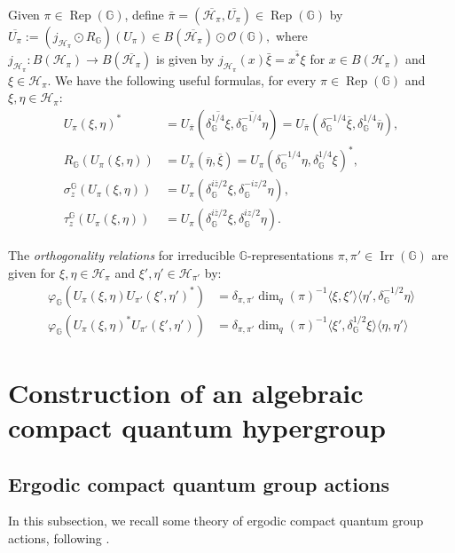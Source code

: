 \documentclass[reqno]{amsart}
\numberwithin{equation}{section}
\DeclareMathOperator{\Rep}{\mathrm{Rep}}
\DeclareMathOperator{\Irr}{\mathrm{Irr}}
\newcommand{\mcH}{\mathcal{H}}
\newcommand{\mcO}{\mathcal{O}}
\newcommand{\G}{\mathbb{G}}
\begin{document}
Given $\pi\in \Rep(\G)$, define $\bar{\pi}= (\overline{\mcH_\pi}, \overline{U_\pi})\in \Rep(\G)$ by
$\overline{U_\pi}:= (j_{\mcH_\pi}\odot R_\G)(U_\pi) \in B(\overline{\mcH_\pi})\odot \mcO(\G),$ where $j_{\mcH_\pi}: B(\mcH_\pi)\to B(\overline{\mcH_\pi})$ is given by $j_{\mcH_\pi}(x)\bar{\xi}= \overline{x^*\xi}$ for $x\in B(\mcH_\pi)$ and $\xi \in \mcH_\pi$. We have the following useful formulas, for every $\pi \in \Rep(\G)$ and $\xi, \eta \in \mcH_\pi$:
\begin{align}
    U_\pi(\xi, \eta)^* &= U_{\bar{\pi}}(\overline{\delta^{1/4}_\G\xi}, \overline{\delta^{-1/4}_\G\eta})= U_{\bar{\pi}}(\delta^{-1/4}_\G \overline{\xi}, \delta^{1/4}_\G \overline{\eta}),\\
    \label{aa}R_\G(U_\pi(\xi, \eta))&= U_{\bar{\pi}}(\overline{\eta}, \overline{\xi})= U_\pi(\delta_\G^{-1/4}\eta, \delta_\G^{1/4}\xi)^*,\\
\label{bb}\sigma_z^\G(U_{\pi}(\xi,\eta)) &= U_{\pi}(\delta_\G^{i\overline{z}/2}\xi,\delta^{-iz/2}_\G\eta),\\
\label{cc}\tau_z^\G(U_{\pi}(\xi,\eta)) &= U_{\pi}(\delta_\G^{i\overline{z}/2}\xi,\delta_\G^{iz/2}\eta).
\end{align}

The \emph{orthogonality relations} for irreducible $\G$-representations $\pi,\pi'\in \Irr(\G)$ are given for $\xi, \eta \in \mcH_\pi$ and $\xi', \eta'\in \mcH_{\pi'}$ by:
\begin{align}\label{EqPW1}
\varphi_\G(U_{\pi}(\xi,\eta)U_{\pi'}(\xi',\eta')^*) &= \delta_{\pi,\pi'} \dim_q(\pi)^{-1}\langle\xi, \xi'\rangle \langle \eta',\delta_\G^{-1/2}\eta\rangle\\
\label{EqPW2}
\varphi_\G(U_{\pi}(\xi,\eta)^*U_{\pi'}(\xi',\eta')) &=\delta_{\pi,\pi'} \dim_q(\pi)^{-1} \langle \xi',\delta_\G^{1/2}\xi\rangle \langle \eta, \eta'\rangle
\end{align}

\section{Construction of an algebraic compact quantum hypergroup}\label{matrixcoefficients}


\subsection{Ergodic compact quantum group actions} In this subsection, we recall some theory of ergodic compact quantum group actions, following \cites{Boc95, BDRV06, DC17}.
\end{document}
